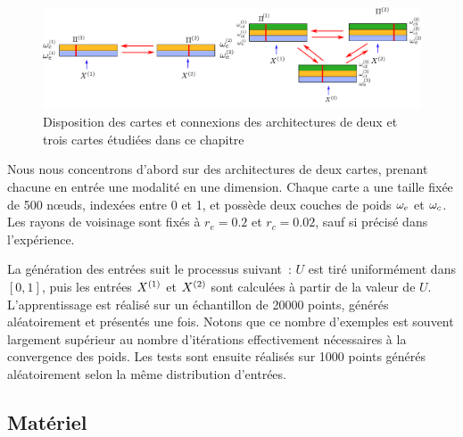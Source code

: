 \documentclass[../main]{subfiles}
\begin{document}
\begin{figure}[h!]
	\includegraphics[width=\textwidth]{archis.pdf}
	\caption{Disposition des cartes et connexions des architectures de deux et trois cartes étudiées dans ce chapitre \label{fig:archis}}
\end{figure}

Nous nous concentrons d'abord sur des architectures de deux cartes, prenant chacune en entrée une modalité en une dimension.
Chaque carte a une taille fixée de 500 n\oe{}uds, indexées entre 0 et 1, et possède deux couches de poids $\omega_e$ et $\omega_c$. Les rayons de voisinage sont fixés à $r_e = 0.2$ et $r_c = 0.02$, sauf si précisé dans l'expérience.

La génération des entrées suit le processus suivant~: $U$ est tiré uniformément dans $[0,1]$, puis les entrées $X^{({1})}$ et $X^{({2})}$ sont calculées à partir de la valeur de $U$. 
L'apprentissage est réalisé sur un échantillon de 20000 points, générés aléatoirement et présentés une fois. Notons que ce nombre d'exemples est souvent largement supérieur au nombre d'itérations effectivement nécessaires à la convergence des poids. 
Les tests sont ensuite réalisés sur 1000 points générés aléatoirement selon la même distribution d'entrées.

\subsection{Matériel}
\end{document}
